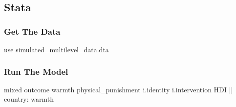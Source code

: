 \documentclass[
  letterpaper,
  DIV=11,
  numbers=noendperiod]{scrreprt}
\newenvironment{Shaded}{\begin{snugshade}}{\end{snugshade}}
\newcommand{\KeywordTok}[1]{\textcolor[rgb]{0.00,0.23,0.31}{#1}}
\newcommand{\NormalTok}[1]{\textcolor[rgb]{0.00,0.23,0.31}{#1}}
\begin{document}
\subsection{Stata}

\subsubsection{Get The Data}\label{get-the-data}

\begin{Shaded}
\begin{Highlighting}[]

\KeywordTok{use}\NormalTok{ simulated\_multilevel\_data.dta}
\end{Highlighting}
\end{Shaded}

\subsubsection{Run The Model}\label{run-the-model}

\begin{Shaded}
\begin{Highlighting}[]
\NormalTok{mixed outcome warmth physical\_punishment i.}\KeywordTok{identity}\NormalTok{ i.intervention HDI || country: warmth}
\end{Highlighting}
\end{Shaded}
\end{document}

